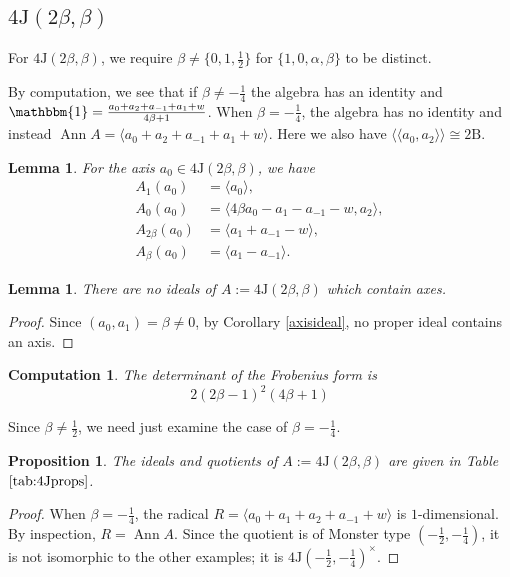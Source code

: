 \documentclass[11pt, a4paper]{article}
\theoremstyle{plain}
\newtheorem{lemma}[theorem]{Lemma}
\newtheorem{proposition}[theorem]{Proposition}
\newtheorem{computation}[theorem]{Computation}
\theoremstyle{definition}
\newcommand\al{\alpha}
\newcommand\bt{\beta}
\newcommand\la{\langle}
\newcommand\ra{\rangle}
\newcommand\lla{\langle\!\langle}
\newcommand\rra{\rangle\!\rangle}
\DeclareMathOperator{\Ann}{Ann}
\newcommand{\B}{\mathrm{B}}
\newcommand{\J}{\mathrm{J}}
\newcommand{\0}{\overline{0}}
\newcommand{\2}{\overline{2}}
\newcommand{\1}{\mathbbm{1}}
\begin{document}
\subsection{$4\J(2\bt, \bt)$}

For $4\J(2\bt, \bt)$, we require $\bt  \neq \{0,1, \frac{1}{2}\}$ for $\{1,0,\al,\bt\}$ to be distinct.

By computation, we see that if $\bt \neq -\frac{1}{4}$ the algebra has an identity and $\1 = \tfrac{a_0 +a_2 +a_{-1}+ a_1 + w}{4\bt + 1}$. When $\bt = -\tfrac{1}{4}$, the algebra has no identity and instead $\Ann A = \la a_0 +a_2 +a_{-1}+ a_1 + w \ra$.  Here we also have $\lla a_0, a_2 \rra \cong 2\B$.


\begin{lemma}
	For the axis $a_0 \in 4\J(2\bt, \bt)$, we have
	\begin{align*}
		A_1(a_0) &= \la a_0 \ra, \\	
		A_0(a_0) &= \la 4\bt a_0 - a_1 - a_{-1} - w, a_2 \ra, \\
		A_{2\bt}(a_0) &= \la a_1 +a_{-1} - w \ra, \\
		A_{\bt}(a_0) &= \la a_1 - a_{-1} \ra.
	\end{align*}
\end{lemma}


\begin{lemma}
	There are no ideals of $A := 4\J(2\bt, \bt)$ which contain axes.
\end{lemma}
\begin{proof}Since $(a_0, a_1) = \bt \neq 0$, by Corollary \ref{axisideal}, no proper ideal contains an axis.
\end{proof}


\begin{computation}
	The determinant of the Frobenius form is
	\[
	2  (2\beta - 1)^2  (4\beta + 1)
	\]
\end{computation}

Since $\bt \neq \frac{1}{2}$, we need just examine the case of $\bt = -\frac{1}{4}$.

\begin{proposition}
The ideals and quotients of $A := 4\J(2\bt, \bt)$ are given in Table $\ref{tab:4Jprops}$.
\end{proposition}

\begin{proof}
When $\bt = -\frac{1}{4}$, the radical $R = \la a_0 + a_1 + a_2 + a_{-1} + w\ra$ is $1$-dimensional. By inspection, $R = \Ann A$.  Since the quotient is of Monster type $(-\tfrac{1}{2}, -\tfrac{1}{4})$, it is not isomorphic to the other examples; it is $4\J(-\frac{1}{2}, -\frac{1}{4})^\times$.
\end{proof}
\end{document}
